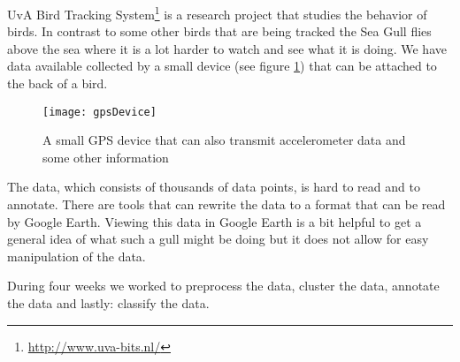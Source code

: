 UvA Bird Tracking System\footnote{\url{http://www.uva-bits.nl/} } is a research 
project that studies the behavior of
birds. 
In contrast to some other birds that are being tracked the Sea Gull flies above the 
sea where it is a lot harder to watch and see what it is doing. We have data available
collected by a small device (see figure \ref{fig:gpsDevice}) that can be attached to 
the back of a bird. 

\begin{figure}[h]
    \center
    \texttt{[image: gpsDevice]}
    \caption{A small GPS device that can also transmit accelerometer data and some other
information}
    \label{fig:gpsDevice}
\end{figure}

The data, which consists of thousands of data points, is hard to read and to annotate. 
There are tools that can rewrite the data to a format that can be read by Google Earth. 
Viewing this data in Google Earth is a bit helpful to get a general idea of what such 
a gull might be doing but it does not allow for easy manipulation of the data. 

During four weeks we worked to preprocess the data, cluster the data, annotate the 
data and lastly: classify the data. 

